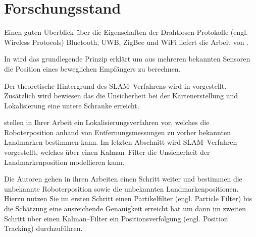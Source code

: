 \documentclass[12pt]{article}
\begin{document}
%
%
%
\section{Forschungsstand}

Einen guten Überblick über die Eigenschaften der Drahtlosen-Protokolle (engl. Wireless Protocols) Bluetooth, UWB, ZigBee und WiFi liefert die Arbeit \cite{lee2007comparative} von \citeauthor{lee2007comparative}.

In \cite{smith1987closed} wird das grundlegende Prinzip erklärt um aus mehreren bekannten Sensoren die Position eines beweglichen Empfängers zu berechnen.

Der theoretische Hintergrund des SLAM--Verfahrens wird in \cite{dissanayake2001solution} vorgestellt. Zusätzlich wird bewiesen das die Unsicherheit bei der Kartenerstellung und Lokalisierung eine untere Schranke erreicht.

\citeauthor{kantor2002preliminary} stellen in Ihrer Arbeit \cite{kantor2002preliminary} ein Lokalisierungsverfahren vor, welches die Roboterposition anhand von Entfernungsmessungen zu vorher bekannten Landmarken bestimmen kann. Im letzten Abschnitt wird SLAM--Verfahren vorgestellt, welches über einen Kalman--Filter die Unsicherheit der Landmarkenposition modellieren kann.

Die Autoren \citeauthor{blanco2008pure} gehen in ihren Arbeiten \cite{blanco2008pure, blanco2008efficient} einen Schritt weiter und bestimmen die unbekannte Roboterposition sowie die unbekannten Landmarkenpositionen. Hierzu nutzen Sie im ersten Schritt einen Partikelfilter (engl. Particle Filter) bis die Schätzung eine ausreichende Genauigkeit erreicht hat um dann im zweiten Schritt über einen Kalman--Filter ein Positionsverfolgung (engl. Position Tracking) durchzuführen.
\end{document}
